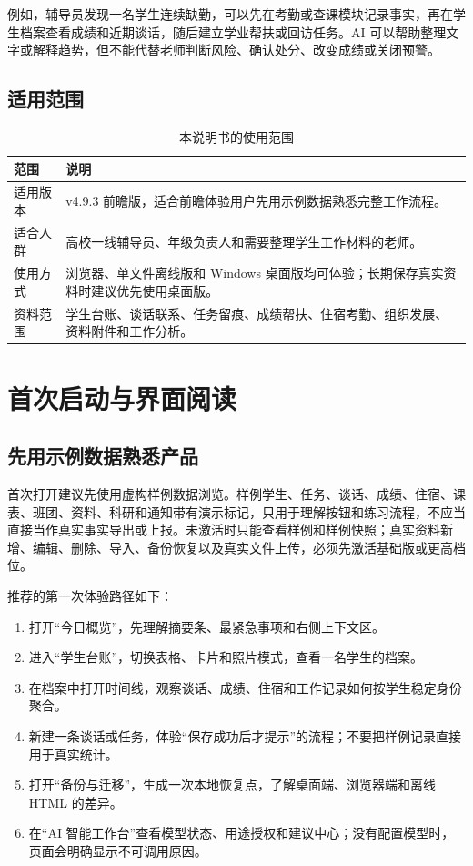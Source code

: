 \documentclass[UTF8,zihao=-4,oneside]{ctexrep}
\begin{document}
例如，辅导员发现一名学生连续缺勤，可以先在考勤或查课模块记录事实，再在学生档案查看成绩和近期谈话，随后建立学业帮扶或回访任务。AI 可以帮助整理文字或解释趋势，但不能代替老师判断风险、确认处分、改变成绩或关闭预警。

\section{适用范围}

\begin{table}[H]
\centering
\caption{本说明书的使用范围}
\begin{tabularx}{\textwidth}{B{30mm} Y}
\toprule
范围 & 说明 \\
\midrule
适用版本 & v4.9.3 前瞻版，适合前瞻体验用户先用示例数据熟悉完整工作流程。 \\
适合人群 & 高校一线辅导员、年级负责人和需要整理学生工作材料的老师。 \\
使用方式 & 浏览器、单文件离线版和 Windows 桌面版均可体验；长期保存真实资料时建议优先使用桌面版。 \\
资料范围 & 学生台账、谈话联系、任务留痕、成绩帮扶、住宿考勤、组织发展、资料附件和工作分析。 \\
\bottomrule
\end{tabularx}
\end{table}

\chapter{首次启动与界面阅读}

\section{先用示例数据熟悉产品}

首次打开建议先使用虚构样例数据浏览。样例学生、任务、谈话、成绩、住宿、课表、班团、资料、科研和通知带有演示标记，只用于理解按钮和练习流程，不应当直接当作真实事实导出或上报。未激活时只能查看样例和样例快照；真实资料新增、编辑、删除、导入、备份恢复以及真实文件上传，必须先激活基础版或更高档位。

推荐的第一次体验路径如下：

\begin{enumerate}
  \item 打开“今日概览”，先理解摘要条、最紧急事项和右侧上下文区。
  \item 进入“学生台账”，切换表格、卡片和照片模式，查看一名学生的档案。
  \item 在档案中打开时间线，观察谈话、成绩、住宿和工作记录如何按学生稳定身份聚合。
  \item 新建一条谈话或任务，体验“保存成功后才提示”的流程；不要把样例记录直接用于真实统计。
  \item 打开“备份与迁移”，生成一次本地恢复点，了解桌面端、浏览器端和离线 HTML 的差异。
  \item 在“AI 智能工作台”查看模型状态、用途授权和建议中心；没有配置模型时，页面会明确显示不可调用原因。
\end{enumerate}
\end{document}

